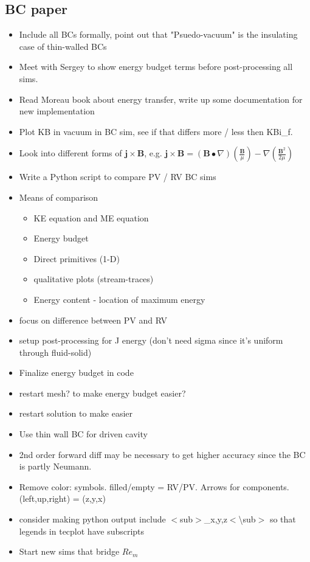 \documentclass[11pt]{article}
\begin{document}
\subsection{BC paper}
\begin{itemize}
\setlength\itemsep{-1em}
\item Include all BCs formally, point out that "Psuedo-vacuum" is the insulating case of thin-walled BCs
\item Meet with Sergey to show energy budget terms before post-processing all sims.
\item Read Moreau book about energy transfer, write up some documentation for new implementation
\item Plot KB in vacuum in BC sim, see if that differs more / less then KBi\_f.
\item Look into different forms of $\mathbf{j}\times \mathbf{B}$, e.g. $\mathbf{j}\times \mathbf{B} = (\mathbf{B}\bullet\nabla) \left(\frac{\mathbf{B}}{\mu}\right) - \nabla \left( \frac{\mathbf{B}^2}{2\mu} \right)$
\item Write a Python script to compare PV / RV BC sims
\item Means of comparison
\begin{itemize}
\setlength\itemsep{-1em}
\item KE equation and ME equation
\item Energy budget
\item Direct primitives (1-D)
\item qualitative plots (stream-traces)
\item Energy content - location of maximum energy
\end{itemize}
\item focus on difference between PV and RV
\item setup post-processing for J energy (don't need sigma since it's uniform through fluid-solid)
\item Finalize energy budget in code
\item restart  mesh? to make energy budget easier?
\item restart solution to make easier
\item Use thin wall BC for driven cavity
\item 2nd order forward diff may be necessary to get higher accuracy since the BC is partly Neumann.
\item Remove color: symbols. filled/empty = RV/PV. Arrows for components. (left,up,right) = (z,y,x)
\item consider making python output include $<$sub$>$\_x,y,z$<$\textbackslash sub$>$ so that legends in tecplot have subscripts
\item Start new sims that bridge $Re_m$
\end{itemize}
\end{document}
